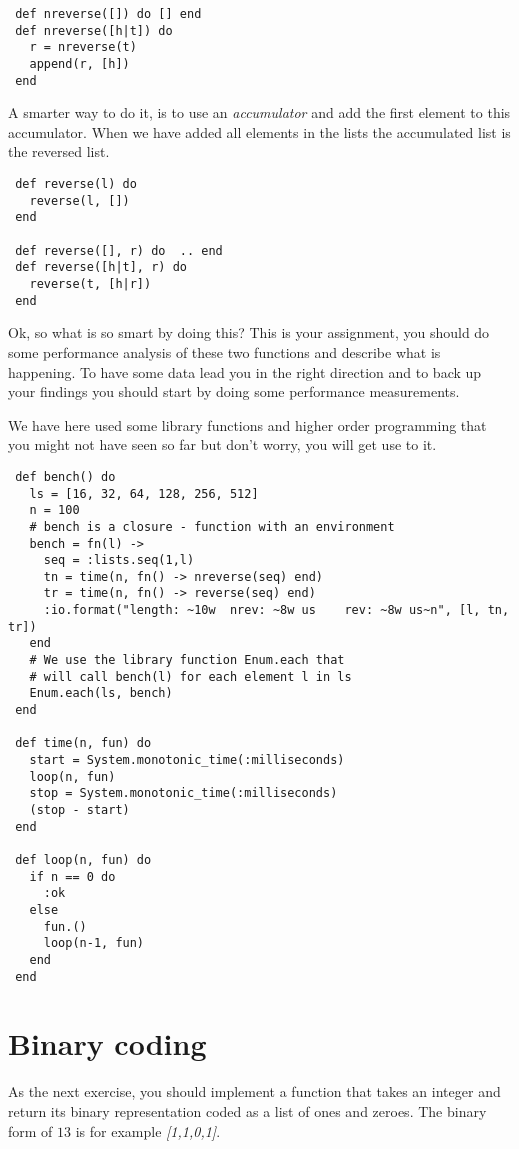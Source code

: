\documentclass[a4paper,11pt]{article}
\begin{document}
{\begin{verbatim}
 def nreverse([]) do [] end
 def nreverse([h|t]) do 
   r = nreverse(t)
   append(r, [h])
 end
\end{verbatim}

A smarter way to do it, is to use an {\em accumulator} and add the
first element to this accumulator. When we have added all elements in
the lists the accumulated list is the reversed list.

\begin{verbatim}
 def reverse(l) do
   reverse(l, [])
 end

 def reverse([], r) do  .. end
 def reverse([h|t], r) do  
   reverse(t, [h|r]) 
 end
\end{verbatim}

Ok, so what is so smart by doing this? This is your assignment, you
should do some performance analysis of these two functions and
describe what is happening. To have some data lead you in the right
direction and to back up your findings you should start by doing some
performance measurements.

We have here used some library functions and higher order programming
that you might not have seen so far but don't worry, you will get use
to it. 


\begin{verbatim}
 def bench() do
   ls = [16, 32, 64, 128, 256, 512]
   n = 100
   # bench is a closure - function with an environment
   bench = fn(l) ->
     seq = :lists.seq(1,l)
     tn = time(n, fn() -> nreverse(seq) end)
     tr = time(n, fn() -> reverse(seq) end)
     :io.format("length: ~10w  nrev: ~8w us    rev: ~8w us~n", [l, tn, tr])
   end
   # We use the library function Enum.each that 
   # will call bench(l) for each element l in ls
   Enum.each(ls, bench)
 end

 def time(n, fun) do
   start = System.monotonic_time(:milliseconds)
   loop(n, fun)
   stop = System.monotonic_time(:milliseconds)
   (stop - start)
 end

 def loop(n, fun) do
   if n == 0 do
     :ok 
   else
     fun.()
     loop(n-1, fun) 
   end
 end
\end{verbatim}


\section{Binary coding}

As the next exercise, you should implement a function that takes an
integer and return its binary representation coded as a list of ones
and zeroes. The binary form of $13$ is for example {\em [1,1,0,1]}. 



}
\end{document}
